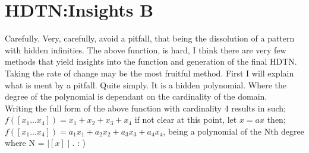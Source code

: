 \documentclass{article}
\begin{document}
\section{HDTN:Insights B}
Carefully. Very, carefully, avoid a pitfall, that being the dissolution of a pattern with hidden infinities.
The above function, is hard, I think there are very few methods that yield insights into the function and generation
of the final HDTN. Taking the rate of change may be the most fruitful method. First I will explain what is ment by a pitfall.
Quite simply. It is a hidden polynomial. Where the degree of the polynomial is dependant on the cardinality of the domain.\\
Writing the full form of the above function with cardinality 4 results in such;\\
$f([x_1...x_4])=x_1+x_2+x_3+x_4$ if not clear at this point, let $x = ax$ then;
$f([x_1...x_4])=a_1x_1+a_2x_2+a_3x_3+a_4x_4$, being a polynomial of the Nth degree where N = $\mid[x]\mid$. : ) 
\end{document}
